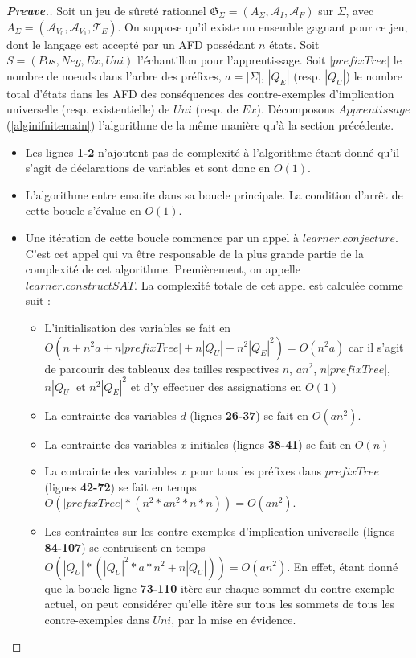 \documentclass[12pt,a4paper,oneside,titlepage]{report}
\newenvironment{demonstration}{\begin{proof}[\textnormal{\textbf{Preuve.}}]}{\end{proof}}
\begin{document}
\begin{demonstration} Soit un jeu de sûreté rationnel $\mathfrak{G}_\Sigma=(A_\Sigma, \mathcal{A}_I, \mathcal{A}_F)$ sur $\Sigma$, avec $A_\Sigma=(\mathcal{A}_{V_0}, \mathcal{A}_{V_1}, \mathcal{T}_E)$. On suppose qu'il existe un ensemble gagnant pour ce jeu, dont le langage est accepté par un AFD possédant $n$ états. Soit $S=(Pos, Neg, Ex, Uni)$ l'échantillon pour l'apprentissage. Soit $|prefixTree|$ le nombre de noeuds dans l'arbre des préfixes, $a=|\Sigma|$, $|Q_E|$ (resp. $|Q_U|$) le nombre total d'états dans les AFD des conséquences des contre-exemples d'implication universelle (resp. existentielle) de $Uni$ (resp. de $Ex$). Décomposons $Apprentissage$ (\ref{alginifnitemain}) l'algorithme de la même manière qu'à la section précédente.
\begin{itemize}
\item Les lignes \textbf{1-2} n'ajoutent pas de complexité à l'algorithme étant donné qu'il s'agit de déclarations de variables et sont donc en $O(1)$.
\item L'algorithme entre ensuite dans sa boucle principale. La condition d'arrêt de cette boucle s'évalue en $O(1)$.
\item Une itération de cette boucle commence par un appel à $learner.conjecture$. C'est cet appel qui va être responsable de la plus grande partie de la complexité de cet algorithme. Premièrement, on appelle $learner.constructSAT$. La complexité totale de cet appel est calculée comme suit :
\begin{itemize}
\item L'initialisation des variables se fait en $O(n+n^2a+n|prefixTree|+n|Q_U|+n^2|Q_E|^2)=O(n^2a)$ car il s'agit de parcourir des tableaux des tailles respectives $n$, $an^2$, $n|prefixTree|$, $n|Q_U|$ et $n^2|Q_E|^2$ et d'y effectuer des assignations en $O(1)$
\item La contrainte des variables $d$ (lignes \textbf{26-37}) se fait en $O(an^2)$.
\item La contrainte des variables $x$ initiales (lignes \textbf{38-41}) se fait en $O(n)$
\item La contrainte des variables $x$ pour tous les préfixes dans $prefixTree$ (lignes \textbf{42-72}) se fait en temps $O(|prefixTree|*(n^2*an^2*n*n))=O(an^2)$.
\item Les contraintes sur les contre-exemples d'implication universelle (lignes \textbf{84-107}) se contruisent en temps $O(|Q_U|*(|Q_U|^2*a*n^2+n|Q_U|))=O(an^2)$. En effet, étant donné que la boucle ligne \textbf{73-110} itère sur chaque sommet du contre-exemple actuel, on peut considérer qu'elle itère sur tous les sommets de tous les contre-exemples dans $Uni$, par la mise en évidence.\\

\end{itemize}
\end{itemize}
\end{demonstration}
\end{document}
